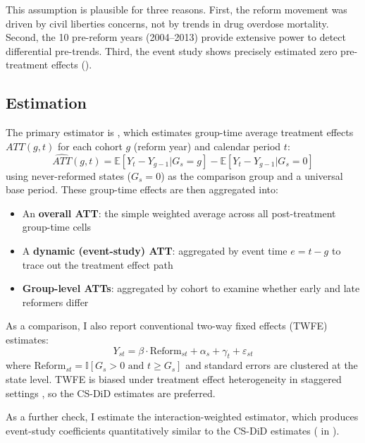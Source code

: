 \documentclass[12pt]{article}
\newcommand{\E}{\mathbb{E}}
\newcommand{\ind}{\mathbb{I}}
\begin{document}
This assumption is plausible for three reasons. First, the reform movement was driven by civil liberties concerns, not by trends in drug overdose mortality. Second, the 10 pre-reform years (2004--2013) provide extensive power to detect differential pre-trends. Third, the event study shows precisely estimated zero pre-treatment effects ().

\subsection{Estimation}

The primary estimator is \citet{callaway2021difference}, which estimates group-time average treatment effects $ATT(g,t)$ for each cohort $g$ (reform year) and calendar period $t$:
\begin{equation}
\widehat{ATT}(g,t) = \E[Y_t - Y_{g-1} | G_s = g] - \E[Y_t - Y_{g-1} | G_s = 0]
\end{equation}
using never-reformed states ($G_s = 0$) as the comparison group and a universal base period. These group-time effects are then aggregated into:

\begin{itemize}
\item An \textbf{overall ATT}: the simple weighted average across all post-treatment group-time cells
\item A \textbf{dynamic (event-study) ATT}: aggregated by event time $e = t - g$ to trace out the treatment effect path
\item \textbf{Group-level ATTs}: aggregated by cohort to examine whether early and late reformers differ
\end{itemize}

As a comparison, I also report conventional two-way fixed effects (TWFE) estimates:
\begin{equation}
Y_{st} = \beta \cdot \text{Reform}_{st} + \alpha_s + \gamma_t + \varepsilon_{st}
\end{equation}
where $\text{Reform}_{st} = \ind[G_s > 0 \text{ and } t \geq G_s]$ and standard errors are clustered at the state level. TWFE is biased under treatment effect heterogeneity in staggered settings \citep{goodman2021difference, de2020two}, so the CS-DiD estimates are preferred.

As a further check, I estimate the \citet{sun2021estimating} interaction-weighted estimator, which produces event-study coefficients quantitatively similar to the CS-DiD estimates ( in ).
\end{document}
